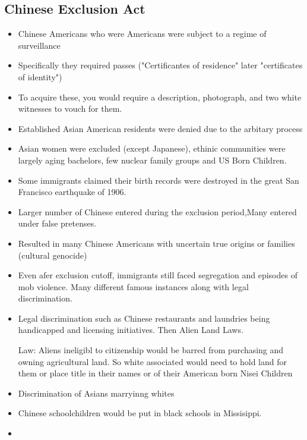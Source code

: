 \documentclass{article}
\begin{document}
\subsection{Chinese Exclusion Act}
\begin{itemize}
  \item Chinese Americans who were Americans were subject to a regime of surveillance
  \item Specifically they required passes ("Certificantes of residence" later "certificates of identity")
  \item To acquire these, you would require a description, photograph, and two white witnesses to
    vouch for them.
  \item Established Asian American residents were denied due to the arbitary process
  \item Asian women were excluded (except Japanese), ethinic communities were largely 
    aging bachelors, few nuclear family groups and US Born Children.
  \item Some immigrants claimed their birth records were destroyed in the great San Francisco earthquake of 1906.
  \item Larger number of Chinese entered during the exclusion period,Many entered under false pretenses.
  \item Resulted in many Chinese Americans with uncertain true origins or families (cultural genocide)
  \item Even afer exclusion cutoff, immigrants still faced segregation and episodes of mob violence. 
    Many different famous instances along with legal discrimination.
  \item Legal discrimination such as Chinese restaurants and laundries being handicapped
    and licensing initiatives. Then Alien Land Laws.
    
    Law: Aliens ineligibl to citizenship would be barred from purchasing and owning agricultural land.
    So white associated would need to hold land for them or place title
    in their names or of their American born Nisei Children
  \item Discrimination of Asians marryinng whites
  \item Chinese schoolchildren would be put in black schools in Missisippi.
  \item 
\end{itemize}
\end{document}
